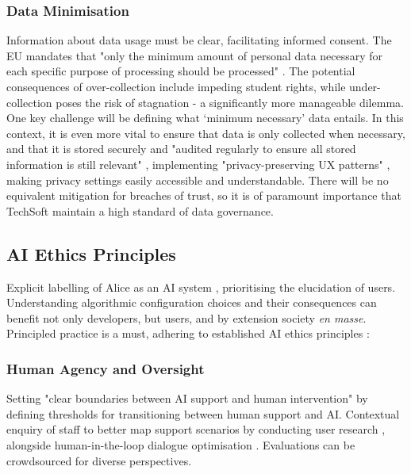 \documentclass[14pt,a4paper]{article}
\begin{document}
\begin{multicols}{2}
\subsubsection{Data Minimisation}
Information about data usage must be clear, facilitating informed consent.
The EU mandates that "only the minimum amount of personal data necessary for each specific purpose of processing should be processed" \textit{\parencite{EU2016}}.
The potential consequences of over-collection include impeding student rights, while under-collection poses the risk of stagnation - a significantly more manageable dilemma.
One key challenge will be defining what `minimum necessary' data entails.
In this context, it is even more vital to ensure that data is only collected when necessary, and that it is stored securely and "audited regularly to ensure all stored information is still relevant" \textit{\parencite{A29WP2018}}, implementing "privacy-preserving UX patterns" \textit{\parencite[pp. 50-100]{Hartzog2024}}, making privacy settings easily accessible and understandable.
There will be no equivalent mitigation for breaches of trust, so it is of paramount importance that TechSoft maintain a high standard of data governance.

\subsection{AI Ethics Principles}
Explicit labelling of Alice as an AI system \textit{\parencite{IEEE2024}}, prioritising the elucidation of users.
Understanding algorithmic configuration choices and their consequences can benefit not only developers, but users, and by extension society \textit{en masse}.
Principled practice is a must, adhering to established AI ethics principles \textit{\parencite{EC2024}}:

\subsubsection{Human Agency and Oversight}

Setting "clear boundaries between AI support and human intervention" \textit{\parencite{APA2024}} by defining thresholds for transitioning between human support and AI.
Contextual enquiry of staff to better map support scenarios by conducting user research \textit{\parencite[pp. 50-100]{Goodman2024}}, alongside human-in-the-loop dialogue optimisation \textit{\parencite[pp. 30-60]{Vaughan2024}}.
Evaluations can be crowdsourced for diverse perspectives.


\end{multicols}
\end{document}

